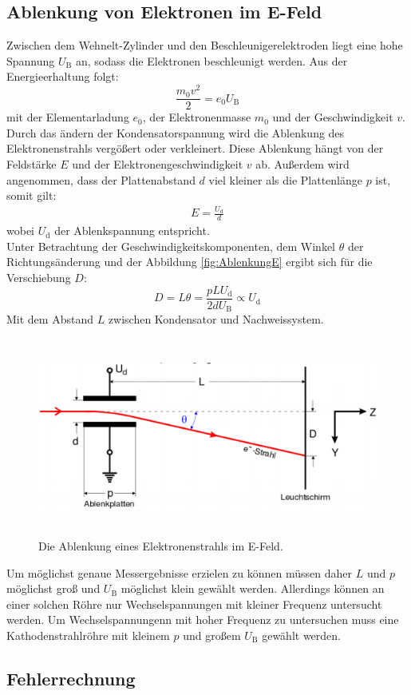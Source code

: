 \subsection{Ablenkung von Elektronen im E-Feld}
Zwischen dem Wehnelt-Zylinder und den Beschleunigerelektroden liegt eine hohe Spannung $U_\text{B}$ an, sodass die Elektronen beschleunigt werden. Aus der Energieerhaltung folgt:
\begin{equation}
	\frac{m_0 v^2}{2} = e_0 U_\text{B}
\end{equation}
mit der Elementarladung $e_0$, der Elektronenmasse $m_0$ und der Geschwindigkeit $v$. \\
Durch das ändern der Kondensatorspannung wird die Ablenkung des Elektronenstrahls vergößert oder verkleinert. Diese Ablenkung hängt von der Feldstärke $E$ und der Elektronengeschwindigkeit $v$ ab. Außerdem wird angenommen, dass der Plattenabstand $d$ viel kleiner als die Plattenlänge $p$ ist, somit gilt:
\begin{align*}
	E = \frac{U_\text{d}}{d}
\end{align*}
wobei $U_\text{d}$ der Ablenkspannung entspricht. \\
Unter Betrachtung der Geschwindigkeitskomponenten, dem Winkel $\theta$ der Richtungsänderung und der Abbildung \eqref{fig:AblenkungE} ergibt sich für die Verschiebung $D$:
\begin{equation}
	D = L\theta = \frac{p L U_\text{d}}{2 d U_\text{B}} \propto U_\text{d}
\end{equation}
Mit dem Abstand $L$ zwischen Kondensator und Nachweissystem. \\

\begin{figure}[H]
	\centering
	\includegraphics[height=6.5cm]{picture/AblenkungEFeld}
	\caption{Die Ablenkung eines Elektronenstrahls im E-Feld. \cite[3]{V501}}
	\label{fig:AblenkungE}
\end{figure}

Um möglichst genaue Messergebnisse erzielen zu können müssen daher $L$ und $p$ möglichst groß und $U_\text{B}$ möglichst klein gewählt werden. Allerdings können an einer solchen Röhre nur Wechselspannungen mit kleiner Frequenz untersucht werden. Um Wechselspannungenn mit hoher Frequenz zu untersuchen muss eine Kathodenstrahlröhre mit kleinem $p$ und großem $U_\text{B}$ gewählt werden.








\subsection{Fehlerrechnung}
